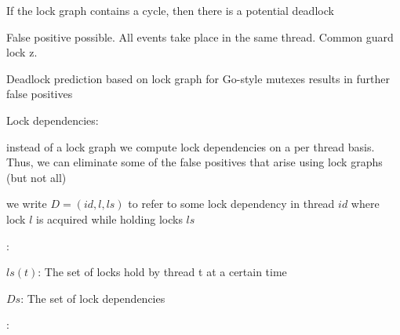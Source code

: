 \documentclass[landscape, a4paper]{article}
\begin{document}
\begin{minipage}[t]{0.2\linewidth}
\begin{betterlist}
\begin{betterlist}
			\item If the lock graph contains a cycle, then there is a potential deadlock
			\item {} False positive possible. All events take place in the same thread. Common guard lock z.
			\begin{betterlist}
				\item Deadlock prediction based on lock graph for Go-style mutexes results in further false positives
			\end{betterlist}
		\end{betterlist}
		\item \alert{Lock dependencies}:
		\begin{betterlist}
			\item instead of a lock graph we compute lock dependencies on a \alert{per thread} basis. Thus, we can eliminate some of the false positives that arise using lock graphs (but not all)%
			\item we write $D = (id, l, ls)$ to refer to some lock dependency in thread $id$ where lock $l$ is acquired while holding locks $ls$
			\item {}:
			\begin{betterlist}
				\item $ls(t)$: The set of locks hold by thread t at a certain time
				\item $Ds$: The set of lock dependencies
			\end{betterlist}
			\item {}:


\end{betterlist}
\end{betterlist}
\end{minipage}
\end{document}
